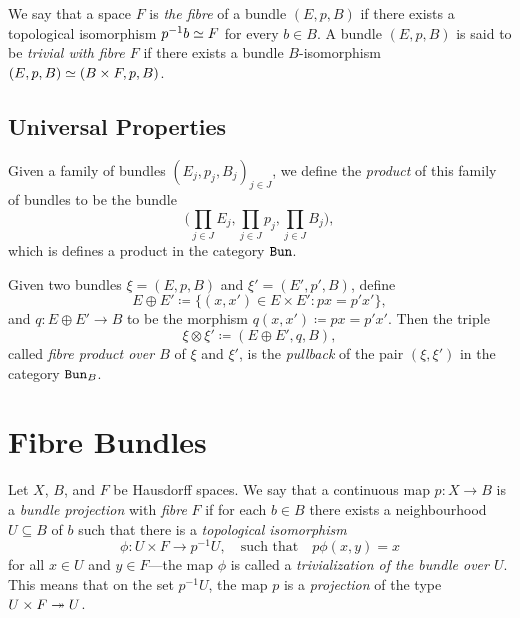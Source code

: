 \begin{definition}
\label{def:fibre-of-a-bundle}
We say that a space \(F\) is \emph{the fibre} of a bundle \((E, p, B)\) if there
exists a topological isomorphism \(p^{-1} b \simeq F\) for every \(b \in B\). A
bundle \((E, p, B)\) is said to be \emph{trivial with fibre \(F\)} if there
exists a bundle \(B\)-isomorphism \((E, p, B) \simeq (B \times F, p, B)\).
\end{definition}

\subsection{Universal Properties}

\begin{proposition}
\label{prop:bundle-products}
Given a family of bundles \((E_j, p_j, B_j)_{j \in J}\), we define the
\emph{product} of this family of bundles to be the bundle
\[
\Big( \prod_{j \in J} E_j, \prod_{j \in J} p_j, \prod_{j \in J} B_j \Big),
\]
which is defines a product in the category \({\texttt{Bun}}\).
\end{proposition}

\begin{proposition}
\label{prop:fibre-product-over-B}
Given two bundles \(\xi = (E, p, B)\) and \(\xi' = (E', p', B)\), define
\[
E \oplus E' \coloneq \{(x, x') \in E \times E' \colon p x = p' x'\},
\]
and \(q: E \oplus E' \to B\) to be the morphism
\(q(x, x') \coloneq p x = p' x'\). Then the triple
\[
\xi \otimes \xi' \coloneq (E \oplus E', q, B),
\]
called \emph{fibre product over \(B\)} of \(\xi\) and \(\xi'\), is the
\emph{pullback} of the pair \((\xi, \xi')\) in the category \({\texttt{Bun}}_B\).
\end{proposition}

\section{Fibre Bundles}

\begin{definition}
\label{def:bundle-projection}
Let \(X\), \(B\), and \(F\) be Hausdorff spaces. We say that a continuous map
\(p: X \to B\) is a \emph{bundle projection} with \emph{fibre} \(F\) if for each
\(b \in B\) there exists a neighbourhood \(U \subseteq B\) of \(b\) such that
there is a \emph{topological isomorphism}
\[
\phi: U \times F \longrightarrow p^{-1} U,
\quad\text{such that}\quad
p \phi(x, y) = x
\]
for all \(x \in U\) and \(y \in F\)---the map \(\phi\) is called a
\emph{trivialization of the bundle over \(U\)}. This means that on the set
\(p^{-1} U\), the map \(p\) is a \emph{projection} of the type
\(U \times F \twoheadrightarrow U\).
\end{definition}

